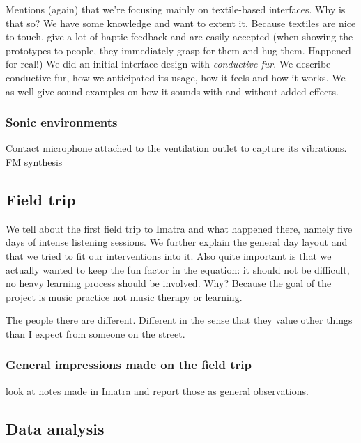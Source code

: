 \documentclass{chi-ext}
\begin{document}
\begin{multicols}{2}
Mentions (again) that we're focusing mainly on textile-based interfaces.
Why is that so? 
	We have some knowledge and want to extent it. 
	Because textiles are nice to touch, give a lot of haptic feedback and are easily accepted (when showing the prototypes to people, they immediately grasp for them and hug them. Happened for real!)
We did an initial interface design with \emph{conductive fur}. 
We describe conductive fur, how we anticipated its usage, how it feels and how it works.
We as well give sound examples on how it sounds with and without added effects.

\subsubsection{Sonic environments}
\label{ssub:sonic_environments}

Contact microphone attached to the ventilation outlet to capture its vibrations.
FM synthesis

\subsection{Field trip}
\label{sub:field_trip}

We tell about the first field trip to Imatra and what happened there, namely five days of intense listening sessions.
We further explain the general day layout and that we tried to fit our interventions into it.
Also quite important is that we actually wanted to keep the fun factor in the equation: it should not be difficult, no heavy learning process should be involved. Why? Because the goal of the project is music practice not music therapy or learning.

The people there are different. Different in the sense that they value other things than I expect from someone on the street.




\subsubsection{General impressions made on the field trip}
\label{ssub:general_impressions_made_on_the_field_trip}

look at notes made in Imatra and report those as general observations.


\subsection{Data analysis}
\label{sub:data_analysis}


\end{multicols}
\end{document}
